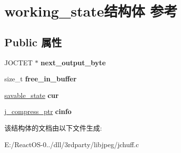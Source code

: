 \hypertarget{structworking__state}{}\section{working\+\_\+state结构体 参考}
\label{structworking__state}
\subsection*{Public 属性}
\begin{DoxyCompactItemize}
\item 
\mbox{\label{structworking__state_aa672d560261c7d8bb78f4014489f9661}} 
J\+O\+C\+T\+ET $\ast$ {\bfseries next\+\_\+output\+\_\+byte}
\item 
\mbox{\label{structworking__state_a2a369c125a91f2aaebbb71ab52e37e7e}} 
size\+\_\+t {\bfseries free\+\_\+in\+\_\+buffer}
\item 
\mbox{\label{structworking__state_a9a55a26239810c0d5ec42c165ee74101}} 
\hyperlink{structsavable__state}{savable\+\_\+state} {\bfseries cur}
\item 
\mbox{\label{structworking__state_ae54d796ba9c39bb85a922db336e3157b}} 
\hyperlink{structjpeg__compress__struct}{j\+\_\+compress\+\_\+ptr} {\bfseries cinfo}
\end{DoxyCompactItemize}


该结构体的文档由以下文件生成\+:\begin{DoxyCompactItemize}
\item 
E\+:/\+React\+O\+S-\/0../dll/3rdparty/libjpeg/jchuff.\+c\end{DoxyCompactItemize}
